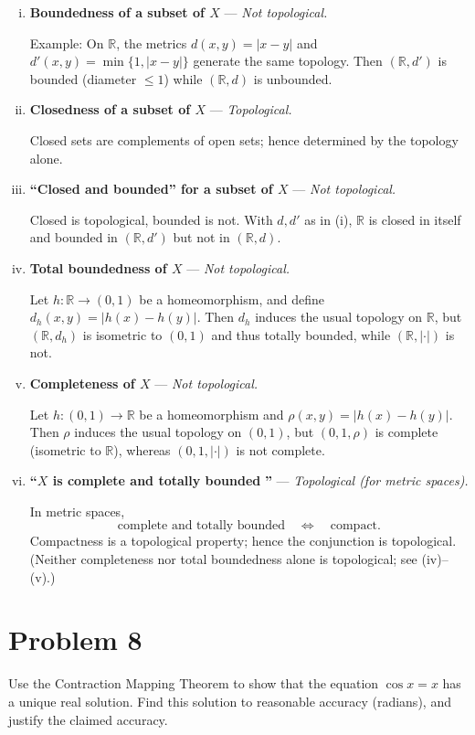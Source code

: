 \documentclass[12pt,a4paper]{article}
\theoremstyle{plain}
\theoremstyle{definition}
\theoremstyle{remark}
\theoremstyle{remark}
\begin{document}
\begin{enumerate}[(i)]
	\item \textbf{Boundedness of a subset of $X$} — \emph{Not topological.}
	
	Example: On $\mathbb R$, the metrics $d(x,y)=|x-y|$ and $d'(x,y)=\min\{1,|x-y|\}$ generate the same
	topology. Then $(\mathbb R,d')$ is bounded (diameter $\le 1$) while $(\mathbb R,d)$ is unbounded.
	
	\item \textbf{Closedness of a subset of $X$} — \emph{Topological.}
	
	Closed sets are complements of open sets; hence determined by the topology alone.
	
	\item \textbf{“Closed and bounded” for a subset of $X$} — \emph{Not topological.}
	
	Closed is topological, bounded is not. With $d,d'$ as in (i), $\mathbb R$ is closed in itself and
	bounded in $(\mathbb R,d')$ but not in $(\mathbb R,d)$.
	
	\item \textbf{Total boundedness of $X$} — \emph{Not topological.}
	
	Let $h:\mathbb R\to(0,1)$ be a homeomorphism, and define $d_h(x,y)=|h(x)-h(y)|$. Then $d_h$
	induces the usual topology on $\mathbb R$, but $(\mathbb R,d_h)$ is isometric to $(0,1)$ and thus
	totally bounded, while $(\mathbb R,|\cdot|)$ is not.
	
	\item \textbf{Completeness of $X$} — \emph{Not topological.}
	
	Let $h:(0,1)\to\mathbb R$ be a homeomorphism and $\rho(x,y)=|h(x)-h(y)|$. Then $\rho$ induces the
	usual topology on $(0,1)$, but $(0,1,\rho)$ is complete (isometric to $\mathbb R$), whereas
	$(0,1,|\cdot|)$ is not complete.
	
	\item \textbf{“$X$ is complete and totally bounded$\,\,$”} — \emph{Topological (for metric spaces).}
	
	In metric spaces,
	\[
	\text{complete and totally bounded}\quad\Longleftrightarrow\quad\text{compact}.
	\]
	Compactness is a topological property; hence the conjunction is topological.
	(Neither completeness nor total boundedness alone is topological; see (iv)–(v).)
\end{enumerate}



\section*{Problem 8}
Use the Contraction Mapping Theorem to show that the equation $\cos x=x$ has a unique real
solution. Find this solution to reasonable accuracy (radians), and justify the claimed accuracy.
\end{document}
